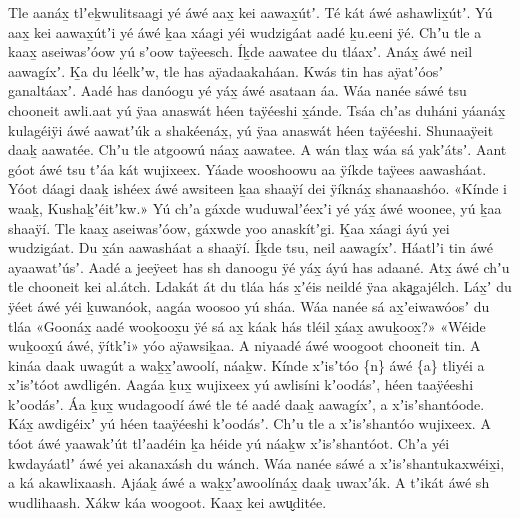 \begin{pairs}
\begin{Leftside}
Tle aanáx̱ tlʼeḵwulitsaag̱i yé áwé aax̱ kei aawax̱útʼ.
Té kát áwé ashawlix̱útʼ.
Yú aax̱ kei aawax̱útʼi yé áwé ḵaa xáagi yéi wudzig̱áat aadé ḵu.eeni ÿé.
Chʼu tle a kaax̱ aseiwasʼóow yú sʼoow taÿeesch.
Íḵde aawatee du tláaxʼ.
Anáx̱ áwé neil aawag̱íxʼ.
Ḵa du léelkʼw, tle has aÿadaakaháan.
Kwás tin has aÿatʼóosʼ gan\-altáaxʼ.
Aadé has danóogu yé yáx̱ áwé asataan áa.
Wáa nanée sáwé tsu chooneit awli.aat yú ÿaa anaswát héen taÿéeshi x̱ánde.
Tsáa chʼas duháni yáanáx̱ kulagéiÿi áwé aawatʼúk a shakéenáx̱, yú ÿaa anaswát héen taÿéeshi.
Shunaaÿeit daaḵ aawatée.
Chʼu tle atgoowú náax̱ aawatee.
A wán tlax̱ wáa sá yakʼátsʼ.
\pend
\pstart
{}Aant góot áwé tsu tʼáa kát wujixeex.\linebreak
{}Yáade wooshoowu aa ÿíkde taÿees aawa\-sháat.
Yóot dáag̱i daaḵ ishéex áwé awsiteen ḵaa shaaÿí dei ÿíknáx̱ shanaashóo.
«\!Kínde i waaḵ, Kushaḵʼéitʼkw.\!»
Yú chʼa gáxde wuduwalʼéexʼi yé yáx̱ áwé woonee, yú ḵaa shaaÿí.
Tle kaax̱ aseiwasʼóow, gáxwde yoo anaskítʼgi.
Ḵaa xáagi áyú yei wudzig̱áat.
Du x̱án aawasháat a shaaÿí.
Íḵde tsu, neil aawag̱íxʼ.
Háatlʼi tin áwé ayaawatʼúsʼ.
Aadé a jeeÿeet has sh danoogu ÿé yáx̱ áyú has adaané.
Atx̱ áwé chʼu tle chooneit kei al.átch.
Ldakát át du tláa hás x̱ʼéis neil\-dé ÿaa aka̬gajélch.
Láx̱ʼ du ÿéet áwé yéi ḵu\-wanóok, aag̱áa woosoo yú sháa.
Wáa nanée sá ax̱ʼeiwawóosʼ du tláa
«\!Goonáx̱ aadé wooḵoox̱u ÿé sá ax̱ káak hás tléil x̱áax̱ awuḵoox̱?\!»
«\!Wéide wuḵoox̱ú áwé, ÿítkʼi\!»\linebreak
{}yóo aÿawsiḵaa.
A niyaadé áwé woogoot chooneit tin.
A kináa daak uwagút a waḵx̱ʼawoolí, náaḵw.
Kínde xʼisʼtóo \{n\} áwé \{a\} tliyéi a xʼisʼtóot awdlig̱én.
Aag̱áa ḵux̱ wujixeex yú awlisíni kʼoodásʼ, héen taa\-ÿéeshi kʼoodásʼ.
Áa ḵux̱ wudagoodí áwé tle té aadé daaḵ aawag̱íxʼ, a xʼisʼshantóode.
Káx̱ awdig̱éixʼ yú héen taaÿéeshi kʼoodásʼ.
Chʼu tle a xʼisʼshantóo wujixeex.
A tóot áwé yaawakʼút tlʼaadéin ḵa héide yú náaḵw xʼisʼshantóot.
Chʼa yéi kwdayáatlʼ áwé yei akanaxásh du wánch.
Wáa nanée sáwé a xʼisʼshantukaxwéix̱i, a ká akawlixaash.
Ajáaḵ áwé a waḵx̱ʼawoolínáx̱ daaḵ uwaxʼák.
A tʼikát áwé sh wudlihaash.
Xákw káa woogoot.
Kaax̱ kei awu̬ditée.

\end{Leftside}
\end{pairs}
